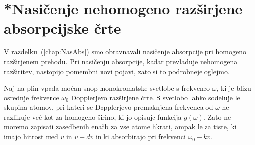 \section{*Nasičenje nehomogeno razširjene absorpcijske črte}

V razdelku~(\ref{chap:NasAbs}) smo obravnavali nasičenje absorpcije pri homogeno 
razširjenem prehodu. Pri nasičenju absorpcije, kadar prevladuje nehomogena razširitev,
nastopijo pomembni novi pojavi, zato si to podrobneje oglejmo.

Naj na plin vpada močan snop monokromatske svetlobe s frekvenco $\omega$,
ki je blizu osrednje frekvence $\omega_{0}$ Dopplerjevo razširjene črte. S svetlobo
lahko sodeluje le skupina atomov, pri kateri se Dopplerjevo premaknjena
frekvenca od $\omega$ ne razlikuje več kot za homogeno širino, ki
jo opisuje funkcija $g(\omega)$. Zato ne moremo zapisati zasedbenih
enačb za vse atome hkrati, ampak le za tiste, ki imajo hitrost med
$v$ in $v+dv$ in ki absorbirajo pri frekvenci $\omega_{0}-kv$.

